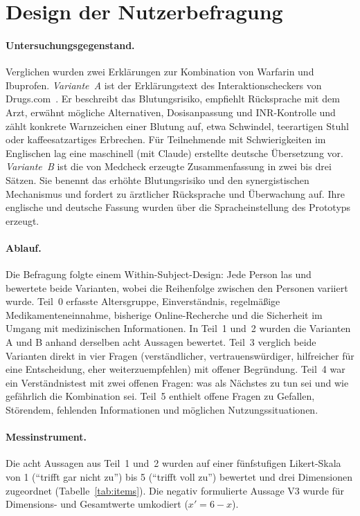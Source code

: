\section{Design der Nutzerbefragung}
\label{sec:befragungsdesign}

\paragraph{Untersuchungsgegenstand.} Verglichen wurden zwei Erklärungen zur Kombination von Warfarin und Ibuprofen. \emph{Variante~A} ist der Erklärungstext des Interaktionscheckers von Drugs.com~\cite{DrugsCom2025}. Er beschreibt das Blutungsrisiko, empfiehlt Rücksprache mit dem Arzt, erwähnt mögliche Alternativen, Dosisanpassung und INR-Kontrolle und zählt konkrete Warnzeichen einer Blutung auf, etwa Schwindel, teerartigen Stuhl oder kaffeesatzartiges Erbrechen. Für Teilnehmende mit Schwierigkeiten im Englischen lag eine maschinell (mit Claude) erstellte deutsche Übersetzung vor. \emph{Variante~B} ist die von Medcheck erzeugte Zusammenfassung in zwei bis drei Sätzen. Sie benennt das erhöhte Blutungsrisiko und den synergistischen Mechanismus und fordert zu ärztlicher Rücksprache und Überwachung auf. Ihre englische und deutsche Fassung wurden über die Spracheinstellung des Prototyps erzeugt.

\paragraph{Ablauf.} Die Befragung folgte einem Within-Subject-Design: Jede Person las und bewertete beide Varianten, wobei die Reihenfolge zwischen den Personen variiert wurde. Teil~0 erfasste Altersgruppe, Einverständnis, regelmäßige Medikamenteneinnahme, bisherige Online-Recherche und die Sicherheit im Umgang mit medizinischen Informationen. In Teil~1 und~2 wurden die Varianten A und B anhand derselben acht Aussagen bewertet. Teil~3 verglich beide Varianten direkt in vier Fragen (verständlicher, vertrauenswürdiger, hilfreicher für eine Entscheidung, eher weiterzuempfehlen) mit offener Begründung. Teil~4 war ein Verständnistest mit zwei offenen Fragen: was als Nächstes zu tun sei und wie gefährlich die Kombination sei. Teil~5 enthielt offene Fragen zu Gefallen, Störendem, fehlenden Informationen und möglichen Nutzungssituationen.

\paragraph{Messinstrument.} Die acht Aussagen aus Teil~1 und~2 wurden auf einer fünfstufigen Likert-Skala von 1 (\enquote{trifft gar nicht zu}) bis 5 (\enquote{trifft voll zu}) bewertet und drei Dimensionen zugeordnet (Tabelle~\ref{tab:items}). Die negativ formulierte Aussage V3 wurde für Dimensions- und Gesamtwerte umkodiert (\(x' = 6 - x\)).

